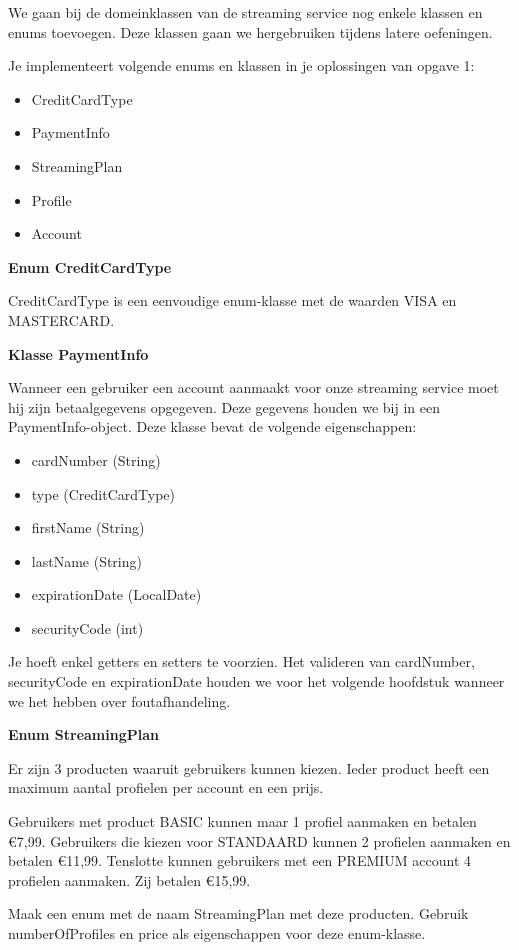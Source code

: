 \begin{oefening}
We gaan bij de domeinklassen van de streaming service nog enkele klassen en enums toevoegen. Deze klassen gaan we hergebruiken tijdens latere oefeningen. 

Je implementeert volgende enums en klassen in je oplossingen van opgave 1:
\begin{itemize}
\item CreditCardType
\item PaymentInfo
\item StreamingPlan
\item Profile
\item Account
\end{itemize}

\textbf{Enum CreditCardType}

CreditCardType is een eenvoudige enum-klasse met de waarden VISA en MASTERCARD.

\textbf{Klasse PaymentInfo}

Wanneer een gebruiker een account aanmaakt voor onze streaming service moet hij zijn betaalgegevens opgegeven. Deze gegevens houden we bij in een PaymentInfo-object.
Deze klasse bevat de volgende eigenschappen:

\begin{itemize}
\item cardNumber (String)
\item type (CreditCardType)
\item firstName (String)
\item lastName (String)
\item expirationDate (LocalDate)
\item securityCode (int)
\end{itemize}

Je hoeft enkel getters en setters te voorzien. Het valideren van cardNumber, securityCode en expirationDate houden we voor het volgende hoofdstuk wanneer we het hebben over foutafhandeling.

\textbf{Enum StreamingPlan}

Er zijn 3 producten waaruit gebruikers kunnen kiezen. Ieder product heeft een maximum aantal profielen per account en een prijs. 

Gebruikers met product BASIC kunnen maar 1 profiel aanmaken en betalen €7,99.
Gebruikers die kiezen voor STANDAARD kunnen 2 profielen aanmaken en betalen €11,99.
Tenslotte kunnen gebruikers met een PREMIUM account 4 profielen aanmaken. Zij betalen €15,99.

Maak een enum met de naam StreamingPlan met deze producten. Gebruik numberOfProfiles en price als eigenschappen voor deze enum-klasse. 


\end{oefening}
